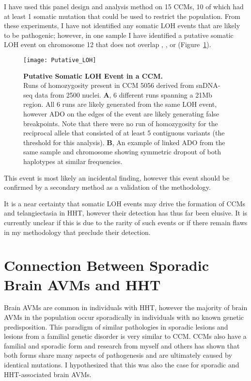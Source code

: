 I have used this panel design and analysis method on 15 CCMs, 10 of which had at least 1 somatic mutation that could be used to restrict the population. From these experiments, I have not identified any somatic LOH events that are likely to be pathogenic; however, in one sample I have identified a putative somatic LOH event on chromosome 12 that does not overlap , , or  (Figure~\ref{Putative_LOH}). 
\begin{figure}[tbp!]
\begin{center}
\texttt{[image: Putative\_LOH]}
\end{center}
\caption[Putative Somatic LOH Event in a CCM]{\textbf{Putative Somatic LOH Event in a CCM.} \\ Runs of homozygosity present in CCM 5056 derived from snDNA-seq data from 2500 nuclei. \textbf{A}, 6 different runs spanning a 21Mb region. All 6 runs are likely generated from the same LOH event, however ADO on the edges of the event are likely generating false breakpoints. Note that there were no run of homozygosity for the reciprocal allele that consisted of at least 5 contiguous variants (the threshold for this analysis). \textbf{B}, An example of linked ADO from the same sample and chromosome showing symmetric dropout of both haplotypes at similar frequencies.}
\label{Putative_LOH}
\end{figure}
This event is most likely an incidental finding, however this event should be confirmed by a secondary method as a validation of the methodology.

It is a near certainty that somatic LOH events may drive the formation of CCMs and telangiectasia in HHT, however their detection has thus far been elusive. It is currently unclear if this is due to the rarity of such events or if there remain flaws in my methodology that preclude their detection.







\section{Connection Between Sporadic Brain AVMs and HHT}
Brain AVMs are common in individuals with HHT, however the majority of brain AVMs in the population occur sporadically in individuals with no known genetic predisposition. This paradigm of similar pathologies in sporadic lesions and lesions from a familial genetic disorder is very similar to CCM. CCMs also have a familial and sporadic form and research from myself and others has shown that both forms share many aspects of pathogenesis and are ultimately caused by identical mutations. I hypothesized that this was also the case for sporadic and HHT-associated brain AVMs.

